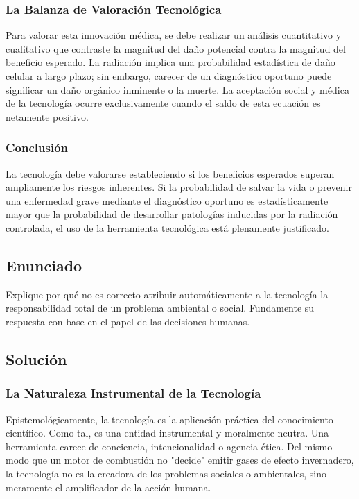 \documentclass[12pt, a4paper]{article}
\begin{document}
\subsubsection*{La Balanza de Valoración Tecnológica}
Para valorar esta innovación médica, se debe realizar un análisis cuantitativo y cualitativo que contraste la magnitud del daño potencial contra la magnitud del beneficio esperado. La radiación implica una probabilidad estadística de daño celular a largo plazo; sin embargo, carecer de un diagnóstico oportuno puede significar un daño orgánico inminente o la muerte. La aceptación social y médica de la tecnología ocurre exclusivamente cuando el saldo de esta ecuación es netamente positivo.

\subsubsection*{Conclusión}
La tecnología debe valorarse estableciendo si los beneficios esperados superan ampliamente los riesgos inherentes. Si la probabilidad de salvar la vida o prevenir una enfermedad grave mediante el diagnóstico oportuno es estadísticamente mayor que la probabilidad de desarrollar patologías inducidas por la radiación controlada, el uso de la herramienta tecnológica está plenamente justificado.

\newpage

\subsection*{Enunciado}
Explique por qué no es correcto atribuir automáticamente a la tecnología la responsabilidad total de un problema ambiental o social. Fundamente su respuesta con base en el papel de las decisiones humanas.

\subsection*{Solución}

\subsubsection*{La Naturaleza Instrumental de la Tecnología}
Epistemológicamente, la tecnología es la aplicación práctica del conocimiento científico. Como tal, es una entidad instrumental y moralmente neutra. Una herramienta carece de conciencia, intencionalidad o agencia ética. Del mismo modo que un motor de combustión no "decide" emitir gases de efecto invernadero, la tecnología no es la creadora de los problemas sociales o ambientales, sino meramente el amplificador de la acción humana.
\end{document}
